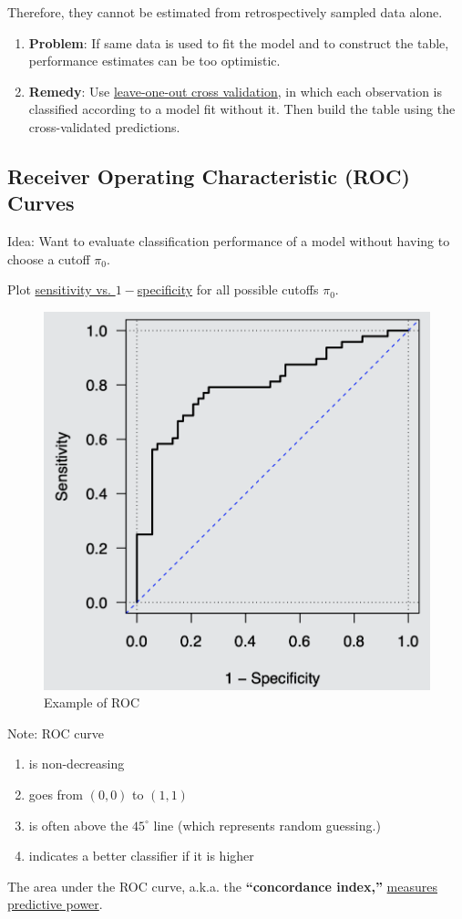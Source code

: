 \documentclass[11pt]{elegantbook}
\begin{document}
Therefore, they cannot be estimated from retrospectively sampled data alone.

\begin{enumerate}[-]
    \item \textbf{Problem}: If same data is used to fit the model and to construct the table, performance estimates can be too optimistic.
    \item \textbf{Remedy}: Use \underline{leave-one-out cross validation}, in which each observation is classified according to a model fit without it. Then build the table using the cross-validated predictions.
\end{enumerate}

\subsection{Receiver Operating Characteristic (ROC) Curves}
Idea: Want to evaluate classification performance of a model without having to choose a cutoff $\pi_0$.

Plot \underline{sensitivity vs. $1 - $specificity} for all possible cutoffs $\pi_0$.
\begin{center}\begin{figure}[htbp]
    \centering
    \includegraphics[scale=0.25]{ROC.png}
    \caption{Example of ROC}
    \label{}
\end{figure}\end{center}
Note: ROC curve
\begin{enumerate}[$\bullet$]
    \item is non-decreasing
    \item goes from $(0, 0)$ to $(1, 1)$
    \item is often above the $45^\circ$ line (which represents random guessing.)
    \item indicates a better classifier if it is higher
\end{enumerate}
The area under the ROC curve, a.k.a. the \textbf{“concordance index,”} \underline{measures predictive power}.
\end{document}
